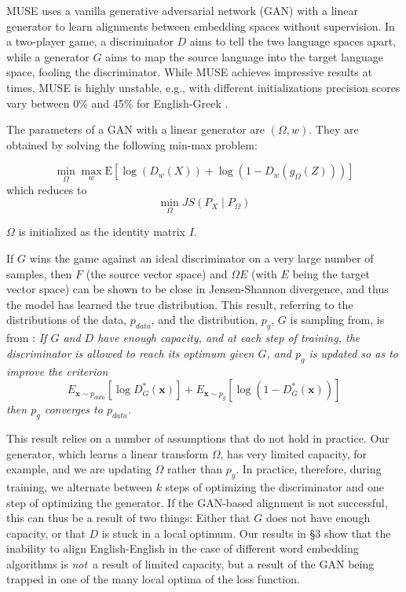 \documentclass[11pt,a4paper]{article}
\begin{document}
MUSE \cite{Conneau:ea:18} uses a vanilla generative adversarial network (GAN) with a linear generator to learn alignments between embedding spaces without supervision. In a two-player game, a discriminator $D$ aims to tell the two language spaces apart, while a generator $G$ aims to map the source language into the target language space, fooling the discriminator. While MUSE achieves impressive results at times, MUSE is highly unstable, e.g., with different initializations precision scores vary between 0\% and 45\% for English-Greek \cite{Soegaard2018}.

The parameters of a GAN with a linear generator are $(\Omega, w)$. They are obtained by solving the following min-max problem:

\begin{equation}\label{minmax}\min_\Omega\max_w
\mathrm{E}[\log(D_w(X)) + \log(1 - D_w(g_\Omega(Z)))]\end{equation} which reduces to \begin{equation}\label{jsd}\min_\Omega\mathit{JS}(P_X\mid P_\Omega)\end{equation}

$\Omega$ is initialized as the identity matrix $I$. 

If $G$ wins the game against an ideal discriminator on a very large number of samples, then $F$ (the source vector space) and $\Omega E$ (with $E$ being the target vector space) can be shown to be close in Jensen-Shannon divergence, and thus the model has learned the true distribution. This result, referring to the distributions of the data, $p_{\mathit{data}}$, and the distribution, $p_g$, $G$ is sampling from, is from \citet{Goodfellow2014}: {\em If $G$ and $D$ have enough capacity, and at each step of training, the discriminator
is allowed to reach its optimum given $G$, and $p_g$ is updated so as to improve the criterion
$$E_{\mathbf{x}\sim p_{\mathit{data}}}[
	\log D_G^{\ast}(\mathbf{x})] 
+ E_{\mathbf{x}\sim p_g} [\log(1 - D^{\ast}_G(\mathbf{x}))]$$
then $p_g$ converges to $p_{\mathit{data}}$.}

This result relies on a number of assumptions that do not hold in practice. Our generator, which learns a linear transform $\Omega$, has very limited capacity, for example, and we are updating $\Omega$ rather than $p_g$. In practice, therefore, during training, we alternate between $k$ steps of optimizing
the discriminator and one step of optimizing the generator. If the GAN-based alignment is not successful, this can thus be a result of two things: Either that $G$ does not have enough capacity, or that $D$ is stuck in a local optimum. Our results in \S3 show that the inability to align English-English in the case of different word embedding algorithms is {\em not}~a result of limited capacity, but a result of the GAN being trapped in %
one of the many local optima of the loss function.
\end{document}
